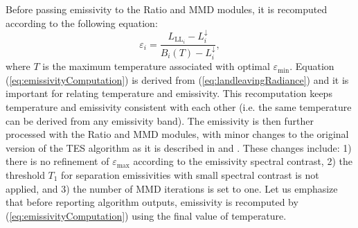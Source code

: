 Before passing emissivity to the Ratio and MMD modules, it is  {recomputed} according to the following equation:
\begin{equation}
\varepsilon_{ {i}} = \frac{L_{\mathrm{LL}_{ {i}}} - L^\downarrow_{ {i}}}{B_{ {i}}(T) - L^\downarrow_{ {i}}},
\label{eq:emissivityComputation}
\end{equation}
where $T$ is the maximum temperature associated with optimal $\varepsilon_\mathrm{min}$. Equation (\ref{eq:emissivityComputation}) is derived from (\ref{eq:landleavingRadiance}) and it is important for relating temperature and emissivity. This recomputation keeps temperature and emissivity consistent with each other (i.e. the same temperature can be derived from any emissivity band). The emissivity is then further processed with the Ratio and MMD modules, with minor changes to  {the} original version of the TES algorithm as it is described in \cite{GR99} and \cite{GR98}. These changes include: 1) there is no refinement of $\varepsilon_\mathrm{max}$ according to the emissivity spectral contrast, 2) the threshold $T_1$ for separation emissivities with small spectral contrast is not applied, and 3) the number of MMD iterations is set to one. Let us emphasize that before reporting algorithm outputs, emissivity is recomputed by (\ref{eq:emissivityComputation}) using the final value of temperature.





